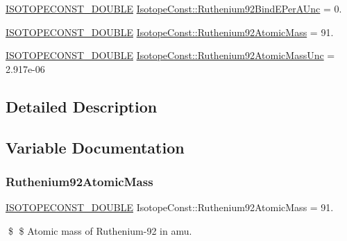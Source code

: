 \begin{DoxyCompactItemize}
\mbox{\hyperlink{group___isotope_const-_macros_ga8f45a7272ce02c0b4c65c44636ed719a}{I\+S\+O\+T\+O\+P\+E\+C\+O\+N\+S\+T\+\_\+\+D\+O\+U\+B\+LE}} \mbox{\hyperlink{group___isotope_const-_ruthenium-_ru92_gae8e32bdbb4d239a12b126c237d8169a6}{Isotope\+Const\+::\+Ruthenium92\+Bind\+E\+Per\+A\+Unc}} = 0.
\item 
\mbox{\hyperlink{group___isotope_const-_macros_ga8f45a7272ce02c0b4c65c44636ed719a}{I\+S\+O\+T\+O\+P\+E\+C\+O\+N\+S\+T\+\_\+\+D\+O\+U\+B\+LE}} \mbox{\hyperlink{group___isotope_const-_ruthenium-_ru92_ga3c0f8558c891299b60b30528b2e6797c}{Isotope\+Const\+::\+Ruthenium92\+Atomic\+Mass}} = 91.
\item 
\mbox{\hyperlink{group___isotope_const-_macros_ga8f45a7272ce02c0b4c65c44636ed719a}{I\+S\+O\+T\+O\+P\+E\+C\+O\+N\+S\+T\+\_\+\+D\+O\+U\+B\+LE}} \mbox{\hyperlink{group___isotope_const-_ruthenium-_ru92_ga2a26c720e001659b0223a06556fdce6e}{Isotope\+Const\+::\+Ruthenium92\+Atomic\+Mass\+Unc}} = 2.\+917e-\/06
\end{DoxyCompactItemize}


\subsection{Detailed Description}


\subsection{Variable Documentation}
\mbox{\label{group___isotope_const-_ruthenium-_ru92_ga3c0f8558c891299b60b30528b2e6797c}} 
\subsubsection{\texorpdfstring{Ruthenium92\+Atomic\+Mass}{Ruthenium92AtomicMass}}
{\footnotesize\ttfamily \mbox{\hyperlink{group___isotope_const-_macros_ga8f45a7272ce02c0b4c65c44636ed719a}{I\+S\+O\+T\+O\+P\+E\+C\+O\+N\+S\+T\+\_\+\+D\+O\+U\+B\+LE}} Isotope\+Const\+::\+Ruthenium92\+Atomic\+Mass = 91.}

\$ \$ Atomic mass of Ruthenium-\/92 in amu. \mbox{\label{group___isotope_const-_ruthenium-_ru92_ga2a26c720e001659b0223a06556fdce6e}} 
